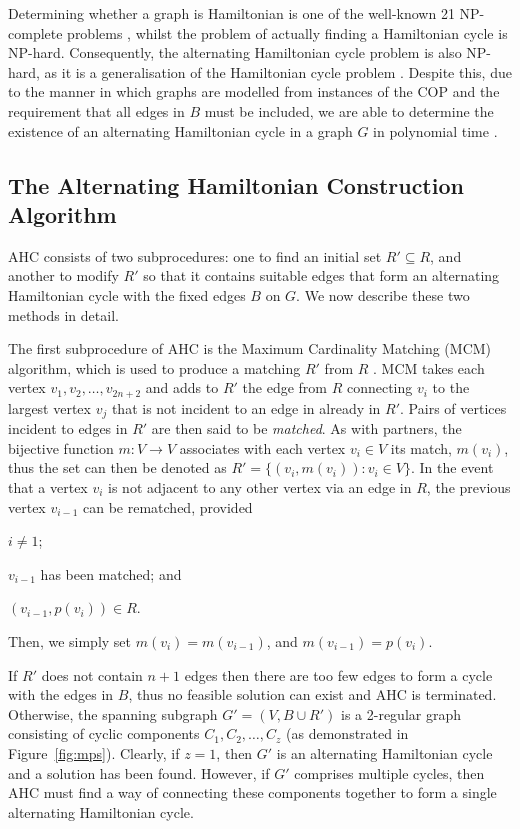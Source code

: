 \documentclass[authoryear]{elsarticle}
\begin{document}
Determining whether a graph is Hamiltonian is one of the well-known 21 NP-complete problems \cite{karp1972}, whilst the problem of actually finding a Hamiltonian cycle is NP-hard. Consequently, the alternating Hamiltonian cycle problem is also NP-hard, as it is a generalisation of the Hamiltonian cycle problem \citep{haggkvist1977}. Despite this, due to the manner in which graphs are modelled from instances of the COP and the requirement that all edges in $B$ must be included, we are able to determine the existence of an alternating Hamiltonian cycle in a graph $G$ in polynomial time \citep{hawa2018}.

\subsection{The Alternating Hamiltonian Construction Algorithm}
\label{sub:ahc}
\noindent AHC consists of two subprocedures: one to find an initial set $R' \subseteq R$, and another to modify $R'$ so that it contains suitable edges that form an alternating Hamiltonian cycle with the fixed edges $B$ on $G$. We now describe these two methods in detail.

The first subprocedure of AHC is the Maximum Cardinality Matching (MCM) algorithm, which is used to produce a matching $R'$ from $R$ \citep{mahadev1994}. MCM takes each vertex $v_1, v_2,\dotsc,v_{2n+2}$ and adds to $R'$ the edge from $R$ connecting $v_i$ to the largest vertex $v_j$ that is not incident to an edge in already in $R'$. Pairs of vertices incident to edges in $R'$ are then said to be \emph{matched}. As with partners, the bijective function $m : V \to V$ associates with each vertex $v_i \in V$ its match, $m(v_i)$, thus the set can then be denoted as $R' = \{(v_i, m(v_i)): v_i \in V\}$. In the event that a vertex $v_i$ is not adjacent to any other vertex via an edge in $R$, the previous vertex $v_{i-1}$ can be rematched, provided 
\begin{enumerate*}[label={(\alph*)}]
	\item $i \neq 1$;
	\item $v_{i-1}$ has been matched; and
	\item $(v_{i-1}, p(v_i)) \in R$.
\end{enumerate*} 
Then, we simply set $m(v_i) = m(v_{i-1})$, and $m(v_{i-1}) = p(v_i)$. 

If $R'$ does not contain $n+1$ edges then there are too few edges to form a cycle with the edges in $B$, thus no feasible solution can exist and AHC is terminated. Otherwise, the spanning subgraph $G'=(V, B \cup R')$ is a 2-regular graph consisting of cyclic components $C_1,C_2,\dotsc,C_z$ (as demonstrated in Figure~\ref{fig:mps}). Clearly, if $z = 1$, then $G'$ is an alternating Hamiltonian cycle and a solution has been found. However, if $G'$ comprises multiple cycles, then AHC must find a way of connecting these components together to form a single alternating Hamiltonian cycle.
\end{document}
